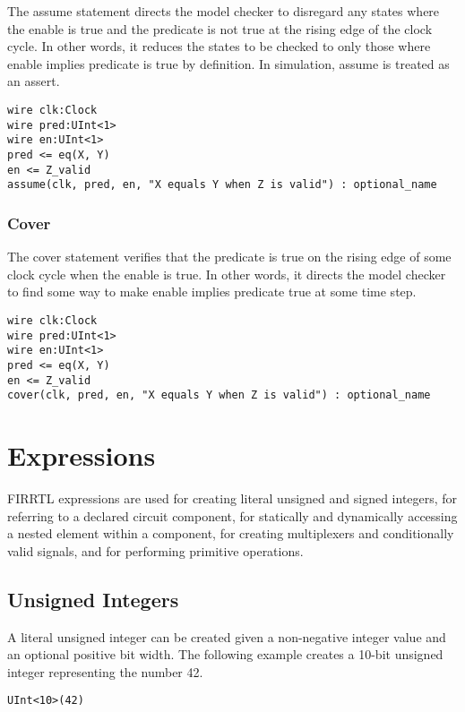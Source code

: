 \documentclass[12pt]{article}
\begin{document}
The assume statement directs the model checker to disregard any states where the enable is true and the predicate is not true at the rising edge of the clock cycle. In other words, it reduces the states to be checked to only those where enable implies predicate is true by definition. In simulation, assume is treated as an assert.

\begin{lstlisting}
wire clk:Clock
wire pred:UInt<1>
wire en:UInt<1>
pred <= eq(X, Y)
en <= Z_valid
assume(clk, pred, en, "X equals Y when Z is valid") : optional_name
\end{lstlisting}

\subsubsection{Cover}

The cover statement verifies that the predicate is true on the rising edge of some clock cycle when the enable is true. In other words, it directs the model checker to find some way to make enable implies predicate true at some time step.

\begin{lstlisting}
wire clk:Clock
wire pred:UInt<1>
wire en:UInt<1>
pred <= eq(X, Y)
en <= Z_valid
cover(clk, pred, en, "X equals Y when Z is valid") : optional_name
\end{lstlisting}

\section{Expressions}

FIRRTL expressions are used for creating literal unsigned and signed integers, for referring to a declared circuit component, for statically and dynamically accessing a nested element within a component, for creating multiplexers and conditionally valid signals, and for performing primitive operations.

\subsection{Unsigned Integers}

A literal unsigned integer can be created given a non-negative integer value and an optional positive bit width. The following example creates a 10-bit unsigned integer representing the number 42.
\begin{lstlisting}
UInt<10>(42)
\end{lstlisting}
\end{document}

